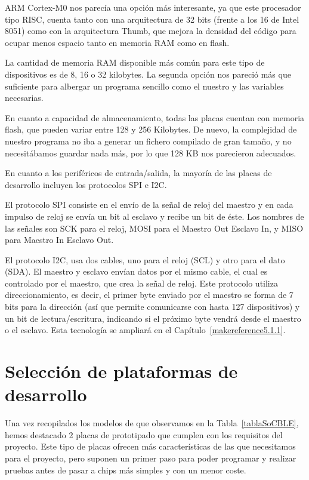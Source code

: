 ARM Cortex-M0 nos parecía una opción más interesante, ya que este procesador tipo RISC, cuenta tanto con una arquitectura de 32 bits (frente a los 16 de Intel 8051) como con la arquitectura Thumb, que mejora la densidad del código para ocupar menos espacio tanto en memoria RAM como en flash.

La cantidad de memoria RAM disponible más común para este tipo de dispositivos es de 8, 16 o 32 kilobytes. La segunda opción nos pareció más que suficiente para albergar un programa sencillo como el nuestro y las variables necesarias.

En cuanto a capacidad de almacenamiento, todas las placas cuentan con memoria flash, que pueden variar entre 128 y 256 Kilobytes. De nuevo, la complejidad de nuestro programa no iba a generar un fichero compilado de gran tamaño, y no necesitábamos guardar nada más, por lo que 128 KB nos parecieron adecuados.

En cuanto a los periféricos de entrada/salida, la mayoría de las placas de desarrollo incluyen los protocolos SPI e I2C.

El protocolo SPI consiste en el envío de la señal de reloj del maestro y en cada impulso de reloj se envía un bit al esclavo y recibe un bit de éste. Los nombres de las señales son SCK para el reloj, MOSI para el Maestro Out Esclavo In, y MISO para Maestro In Esclavo Out.

El protocolo I2C, usa dos cables, uno para el reloj (SCL) y otro para el dato (SDA). El maestro y esclavo envían datos por el mismo cable, el cual es controlado por el maestro, que crea la señal de reloj. Este protocolo utiliza direccionamiento, es decir, el primer byte enviado por el maestro se forma de 7 bits para la dirección (así que permite comunicarse con hasta 127 dispositivos) y un bit de lectura/escritura, indicando si el próximo byte vendrá desde el maestro o el esclavo. Esta tecnología se ampliará en el Capítulo~\ref{makereference5.1.1}.

\section{Selección de plataformas de desarrollo}
\label{makereference3.3}

Una vez recopilados los modelos de que observamos en la Tabla~\ref{tablaSoCBLE}, hemos destacado 2 placas de prototipado que cumplen con los requisitos del proyecto. Este tipo de placas ofrecen más características de las que necesitamos para el proyecto, pero suponen un primer paso para poder programar y realizar pruebas antes de pasar a chips más simples y con un menor coste. 

